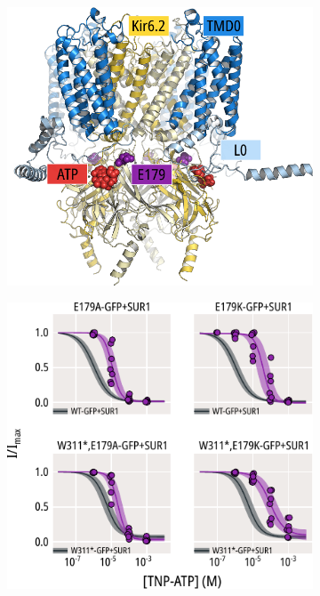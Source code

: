 \begin{figure}[h]
	\centering
	\begin{subfigure}[t]{0.45\textwidth}
		\caption{}\label{ch5fig:e179_loc}
		\centering
		\includegraphics[width=\textwidth]{e179_1.pdf}
	\end{subfigure}
	\hfill
	\begin{subfigure}[t]{0.45\textwidth}
		\caption{}\label{ch5fig:e179_tnpatp_popfits_1}
		\centering
		\includegraphics[width=\textwidth]{e179_3.pdf}

\end{subfigure}
\end{figure}
